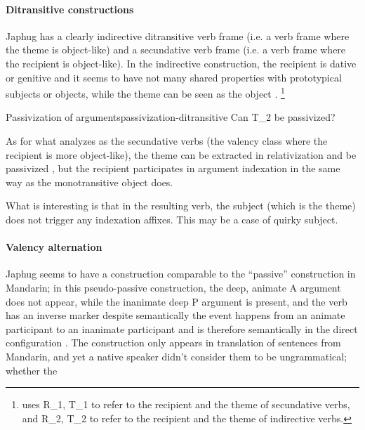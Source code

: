 \documentclass[a4paper, oneside, 12pt]{report}
\newcommand*{\citesec}[1]{\S~{#1}}
\newcommand*{\citepage}[1]{p.~{#1}}
\newcommand*{\citepages}[1]{pp.~{#1}}
\begin{document}
\paragraph*{Ditransitive constructions}
Japhug has a clearly indirective ditransitive verb frame
(i.e. a verb frame where the theme is object-like)
and a secundative verb frame  
(i.e. a verb frame where the recipient is object-like).
In the indirective construction,
the recipient is dative or genitive \citep[\citesec{14.4.1}]{jacques2021grammar}
and it seems to have not many shared properties with prototypical subjects or objects,
while the theme can be seen as the object \citep{jacques2016subjects}.%
\footnote{
    \citet{jacques2016subjects} 
    uses R_1, T_1 to refer to the recipient and the theme of secundative verbs,
    and R_2, T_2 to refer to the recipient and the theme of indirective verbs. 
}

\begin{todobox}{Passivization of arguments}{passivization-ditransitive}
    Can T_2 be passivized?
\end{todobox}

As for what \citet[\citesec{14.4.2}]{jacques2021grammar} analyzes as 
the secundative verbs (the valency class where the recipient is more object-like),
the theme can be extracted in relativization \citep[\citepages{581}]{jacques2021grammar}
and be passivized \citep[\citesec{18.1.4}]{jacques2021grammar},
but the recipient participates in argument indexation
in the same way as the monotransitive object does.

What is interesting is that in the resulting verb,
the subject (which is the theme) does not trigger any indexation affixes.
This may be a case of quirky subject.

\paragraph*{Valency alternation} 
Japhug seems to have a construction comparable to
the ``passive'' construction in Mandarin;
in this pseudo-passive construction,
the deep, animate A argument does not appear, 
while the inanimate deep P argument is present, 
and the verb has an inverse marker 
despite semantically the event happens 
from an animate participant to an inanimate participant
and is therefore semantically in the direct configuration
\citep[\citepage{575}]{jacques2021grammar}.
The construction only appears in translation of sentences from Mandarin,
and yet a native speaker didn't consider them to be ungrammatical;
whether the 
\end{document}
